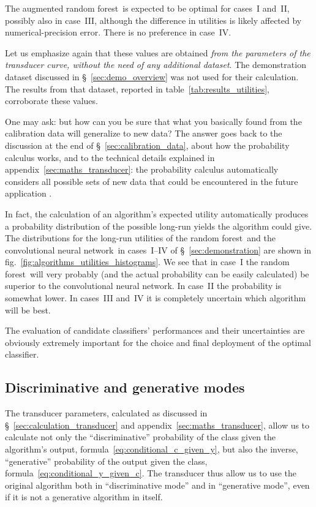 \documentclass[\ifafour a4paper,12pt,\else a5paper,10pt,\fi%
onecolumn,oneside,article,%
british%
]{memoir}
\theoremstyle{remark}
\theoremstyle{innote}
\renewcommand*{\|}[1][]{\nonscript\:#1\vert\nonscript\:\mathopen{}}
\newcommand*{\sect}{\S}%
\newcommand*{\fig}{fig.}%
\newcommand*{\cf}{{cf.}}
\newcommand*{\RF}{random forest}
\newcommand*{\CNN}{convolutional neural network}
\begin{document}
%
The augmented \RF\ is expected to be optimal for cases~I and~II, possibly also in case~III, although the difference in utilities is likely affected by numerical-precision error. There is no preference in case~IV.

Let us emphasize again that these values are obtained \emph{from the parameters of the transducer curve, without the need of any additional dataset}. The demonstration dataset discussed in \sect~\ref{sec:demo_overview} was not used for their calculation. The results from that dataset, reported in table~\ref{tab:results_utilities}, corroborate these values.


One may ask: but how can you be sure that what you basically found from the calibration data will generalize to new data? The answer goes back to the discussion at the end of \sect~\ref{sec:calibration_data}, about how the probability calculus works, and to the technical details explained in appendix~\ref{sec:maths_transducer}: the probability calculus automatically considers all possible sets of new data that could be encountered in the future application \autocites[\cf][]{smithetal2006}.

In fact, the calculation of an algorithm's expected utility automatically produces a probability distribution of the possible long-run yields the algorithm could give. The distributions for the long-run utilities of the \RF\ and the \CNN\ in cases~I--IV of \sect~\ref{sec:demonstration} are shown in \fig~\ref{fig:algorithms_utilities_histograms}.
We see that in case~I the \RF\ will very probably (and the actual probability can be easily calculated) be superior to the \CNN. In case~II the probability is somewhat lower. In cases~III and~IV it is completely uncertain which algorithm will be best.

The evaluation of candidate classifiers' performances and their uncertainties are obviously extremely important for the choice and final deployment of the optimal classifier.

\subsection{Discriminative and generative modes}
\label{sec:effect_transd}

The transducer parameters, calculated as discussed in \sect~\ref{sec:calculation_transducer} and appendix~\ref{sec:maths_transducer}, allow us to calculate not only the \enquote{discriminative} probability of the class given the algorithm's output, formula~\eqref{eq:conditional_c_given_y}, but also the inverse, \enquote{generative} probability \autocites[\sect~21.2.3]{russelletal1995_r2022}[\sect~8.6]{murphy2012} of the output given the class, formula~\eqref{eq:conditional_y_given_c}. The transducer thus allow us to use the original algorithm both in \enquote{discriminative mode} and in \enquote{generative mode}, even if it is not a generative algorithm in itself.
\end{document}
